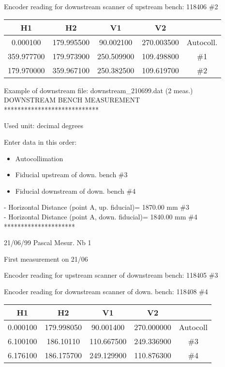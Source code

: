 Encoder reading for downstream scanner of upstream bench: 118406 \#2 

\vspace{0.3cm}
{\centering \begin{tabular}{|c|c|c|c|c|}
\hline 
H1&
H2&
V1&
V2&
\\
\hline 
\hline 
0.000100&
179.995500&
90.002100&
270.003500&
Autocoll.\\
\hline 
359.977700&
179.973900&
250.509900&
109.498800&
\#1\\
\hline 
179.970000&
359.967100&
250.382500&
109.619700&
\#2\\
\hline 
\end{tabular}\par}
\vspace{0.3cm}


Example of downstream file: downstream\_210699.dat (2 meas.) \\

DOWNSTREAM BENCH MEASUREMENT \\

{*}{*}{*}{*}{*}{*}{*}{*}{*}{*}{*}{*}{*}{*}{*}{*}{*}{*}{*}{*}{*}{*}{*}{*}{*}{*}{*}{*} 

Used unit: decimal degrees 

Enter data in this order: 

\begin{itemize}
\item Autocollimation 
\item Fiducial upstream of down. bench \#3 
\item Fiducial downstream of down. bench \#4 
\end{itemize}

- Horizontal Distance (point A, up. fiducial)= 1870.00 mm \#3 \\
- Horizontal Distance (point A, down. fiducial)= 1840.00 mm \#4 \\


{*}{*}{*}{*}{*}{*}{*}{*}{*}{*}{*}{*}{*}{*}{*}{*}{*}{*}{*}{*}{*} 

21/06/99 Pascal Mesur. Nb 1 

First measurement on 21/06 

Encoder reading for upstream scanner of downstream bench: 118405 \#3 

Encoder reading for downstream scanner of down. bench: 118408 \#4

\vspace{0.3cm}
{\centering \begin{tabular}{|c|c|c|c|c|}
\hline 
H1 &
H2&
V1&
V2&
\\
\hline 
\hline 
0.000100&
179.998050&
90.001400&
270.000000&
Autocoll\\
\hline 
6.100100&
186.10110&
110.667500&
249.336900&
\#3\\
\hline 
6.176100&
186.175700&
249.129900&
110.876300&
\#4 \\
\hline 
\end{tabular}\par}
\vspace{0.3cm}

